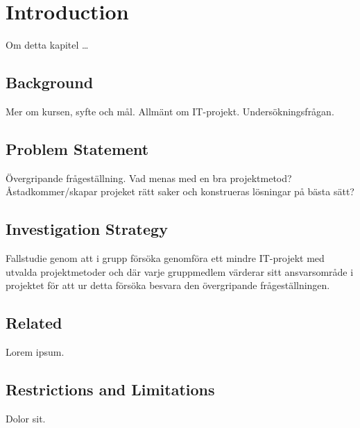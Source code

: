 \section{Introduction}
Om detta kapitel \dots

\subsection{Background}
Mer om kursen, syfte och mål. Allmänt om IT-projekt. Undersökningsfrågan.

\subsection{Problem Statement}
Övergripande frågeställning.
Vad menas med en bra projektmetod? Åstadkommer/skapar projeket rätt saker och konstrueras
lösningar på bästa sätt?

\subsection{Investigation Strategy}
Fallstudie genom att i grupp försöka genomföra ett mindre IT-projekt med utvalda projektmetoder
och där varje gruppmedlem värderar sitt ansvarsområde i projektet för att ur detta försöka
besvara den övergripande frågeställningen.

\subsection{Related}
Lorem ipsum.

\subsection{Restrictions and Limitations}
Dolor sit.
